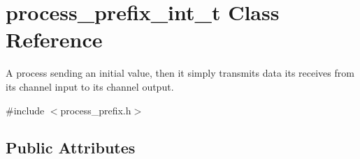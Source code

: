 \hypertarget{structprocess__prefix__int__t}{\section{process\-\_\-prefix\-\_\-int\-\_\-t Class Reference}
\label{structprocess__prefix__int__t}
}


A process sending an initial value, then it simply transmits data its receives from its channel input to its channel output.  




{\ttfamily \#include $<$process\-\_\-prefix.\-h$>$}

\subsection*{Public Attributes}
